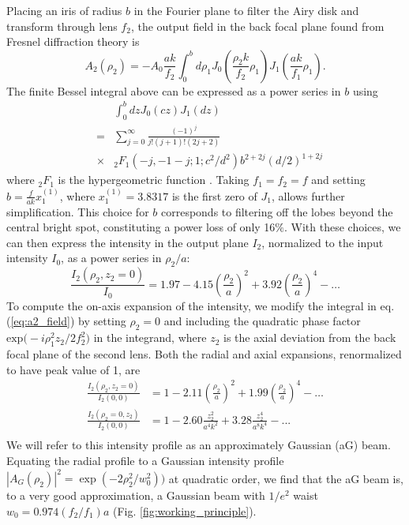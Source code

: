 Placing an iris of radius $b$ in the Fourier plane to filter the Airy disk and transform through lens $f_2$, the output field in the back focal plane found from Fresnel diffraction theory is 
\begin{equation}
A_{2}\left(\rho_{2}\right)=-A_{0} \frac{a k}{f_{2}} \int_{0}^{b} d \rho_{1} J_{0}\left(\frac{\rho_{2} k}{f_{2}} \rho_{1}\right) J_{1}\left(\frac{a k}{f_{1}} \rho_{1}\right).
\label{eq:a2_field}
\end{equation}
 The finite Bessel integral above can be expressed as a power series in $b$ using 
\begin{eqnarray}
     &&\int_{0}^{b} d z J_{0}(c z) J_{1}(d z) \nonumber\\
     &=& 
  \sum_{j=0}^{\infty} \frac{(-1)^{j}}{j !(j+1) !(2 j+2)} \nonumber\\
  &\times&  { }_{2} F_{1}\left(-j,-1-j ; 1 ; c^{2} / d^{2}\right) b^{2+2 j}(d / 2)^{1+2 j}\nonumber
\end{eqnarray}
where $_2F_1$ is the hypergeometric function \cite{pochernyaev1995}. Taking $f_1 = f_2 = f$ and setting $b=\frac{f}{a k} x_1^{(1)}$, where $x_1^{(1)}=3.8317$ is the first zero of $J_1$, allows further simplification. This choice for $b$ corresponds to filtering off the lobes beyond the central bright spot, constituting a power loss of only 16$\%$. With these choices, we can then express the intensity in the output plane $I_2$, normalized to the input intensity $I_0$, as a power series in $\rho_2/a$:
\begin{equation}\label{eq:Iag_radial}
    \frac{I_{2}\left(\rho_{2},z_2=0\right)}{I_{0}}=1.97-4.15\left(\frac{\rho_{2}}{a}\right)^{2}+3.92\left(\frac{\rho_{2}}{a}\right)^{4}-\ldots
\end{equation}
To compute the on-axis expansion of the intensity, we modify the integral in eq. (\ref{eq:a2_field}) by setting $\rho_2=0$ and including the quadratic phase factor $\text{exp}\big(-i\rho_1^2 z_2/2 f_2^2\big)$ in the integrand, where $z_2$ is the axial deviation from the back focal plane of the second lens. Both the radial and axial expansions, renormalized to have peak value of 1, are
\begin{equation}\label{eq:Iag_bright}
\begin{aligned}
\frac{I_{2}\left(\rho_{2},z_2=0\right)}{I_2(0,0)}&=1-2.11\left(\frac{\rho_{2}}{a}\right)^{2}+1.99\left(\frac{\rho_{2}}{a}\right)^{4}-\ldots\\
\frac{I_2(\rho_2=0,z_2)}{I_2(0,0)}&= 1 - 2.60 \frac{z_2^2}{a^4 k^2} + 3.28\frac{z_2^4}{a^8 k^4} - ...\\
\end{aligned}
\end{equation}
We will refer to this intensity profile as an approximately Gaussian (aG) beam. Equating the radial profile to a Gaussian intensity profile $|A_G(\rho_2)|^2 = \exp(-2 \rho_2^2/w_0^2))$ at quadratic order, we find that the aG beam is, to a very good approximation, a Gaussian beam with $1/e^2$ waist $w_0=0.974 (f_2/f_1)a$  (Fig. \ref{fig:working_principle}). 
 
